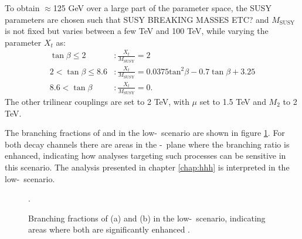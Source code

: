 To obtain \mh$\approx$125 GeV over a large part of the parameter
space, the SUSY parameters are chosen such that SUSY BREAKING MASSES ETC?
and $M_{\text{SUSY}}$ is not fixed but varies between a few TeV and 100 TeV, while
varying the parameter $X_t$ as:
\begin{equation}
\begin{split}
\tan{\beta} \leq 2 &: \frac{X_t}{M_{\text{SUSY}}} = 2\\
2 < \tan{\beta} \leq 8.6 &: \frac{X_t}{M_{\text{SUSY}}} = 0.0375\text{tan}^2\beta - 0.7\tan{\beta} + 3.25\\
8.6 < \tan{\beta} &: \frac{X_t}{M_{\text{SUSY}}} = 0.
\end{split}
\end{equation}
The other trilinear couplings are set to 2 TeV, with $\mu$ set to 1.5 TeV and $M_2$ to 2 TeV.

The branching fractions of \Htohh and \AtoZh in the low-\tanb~scenario are shown in
figure \ref{fig:lowtbhigh_br}. For both decay channels there are areas in the \mA-\tanb~plane
where the branching ratio is enhanced, indicating how analyses targeting such processes 
can be sensitive in this scenario. %
The analysis presented in chapter \ref{chap:hhh} is interpreted
in the low-\tanb~scenario.

\begin{figure}[h!]
\begin{center}
\end{center}
\caption{Branching fractions of (a) \Htohh and (b) \AtoZh in the low-\tanb~scenario, indicating 
areas where both are significantly enhanced \cite{MSSM-lowtanb}.}
\label{fig:lowtbhigh_br}.
\end{figure}

